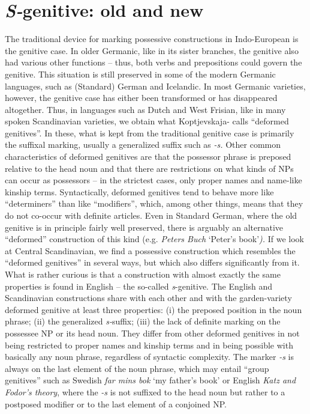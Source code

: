 \section{\textit{S-}genitive: old and new}

\begin{styleBodyTextFirst}
The traditional device for marking possessive constructions in Indo-European is the genitive case. In older Germanic, like in its sister branches, the genitive also had various other functions – thus, both verbs and prepositions could govern the genitive. This situation is still preserved in some of the modern Germanic languages, such as (Standard) German and Icelandic. In most Germanic varieties, however, the genitive case has either been transformed or has disappeared altogether. Thus, in languages such as Dutch and West Frisian, like in many spoken Scandinavian varieties, we obtain what Koptjevskaja-\citet{Tamm2003} calls “deformed genitives”. In these, what is kept from the traditional genitive case is primarily the suffixal marking, usually a generalized suffix such as\textit{ -s}\textit{. }Other common characteristics of deformed genitives are that the possessor phrase is preposed relative to the head noun and that there are restrictions on what kinds of NPs can occur as possessors – in the strictest cases, only proper names and name-like kinship terms. Syntactically, deformed genitives tend to behave more like “determiners” than like “modifiers”, which, among other things, means that they do not co-occur with definite articles. Even in Standard German, where the old genitive is in principle fairly well preserved, there is arguably an alternative “deformed” construction of this kind (e.g. \textit{Peters Buch }‘Peter’s book’\textit{).} If we look at Central Scandinavian, we find a possessive construction which resembles the “deformed genitives” in several ways, but which also differs significantly from it. What is rather curious is that a construction with almost exactly the same properties is found in English – the so-called \textit{s}{}-genitive. The English and Scandinavian constructions share with each other and with the garden-variety deformed genitive at least three properties: (i) the preposed position in the noun phrase; (ii) the generalized \textit{s-}suffix; (iii) the lack of definite marking on the possessee NP or its head noun. They differ from other deformed genitives in not being restricted to proper names and kinship terms and in being possible with basically any noun phrase, regardless of syntactic complexity. The marker\textit{ -s} is always on the last element of the noun phrase, which may entail “group genitives” such as Swedish \textit{far mins bok} ‘my father’s book’ or English \textit{Katz and Fodor’s theory}, where the\textit{ -s}\textit{ }is not suffixed to the head noun but rather to a postposed modifier or to the last element of a conjoined NP. 

\end{styleBodyTextFirst}

